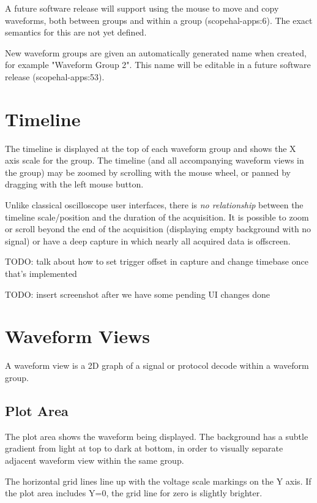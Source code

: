 \documentclass[11pt]{article}
\begin{document}
A future software release will support using the mouse to move and copy waveforms, both between groups and within a
group (scopehal-apps:6). The exact semantics for this are not yet defined.

New waveform groups are given an automatically generated name when created, for example "Waveform Group 2". This name
will be editable in a future software release (scopehal-apps:53).

\pagebreak
\section{Timeline}

The timeline is displayed at the top of each waveform group and shows the X axis scale for the group. The timeline (and
all accompanying waveform views in the group) may be zoomed by scrolling with the mouse wheel, or panned by dragging
with the left mouse button.

Unlike classical oscilloscope user interfaces, there is \emph{no relationship} between the timeline scale/position and
the duration of the acquisition. It is possible to zoom or scroll beyond the end of the acquisition (displaying empty
background with no signal) or have a deep capture in which nearly all acquired data is offscreen.

TODO: talk about how to set trigger offset in capture and change timebase once that's implemented

TODO: insert screenshot after we have some pending UI changes done

\pagebreak
\section{Waveform Views}

A waveform view is a 2D graph of a signal or protocol decode within a waveform group.

\subsection{Plot Area}

The plot area shows the waveform being displayed. The background has a subtle gradient from light at top to dark at
bottom, in order to visually separate adjacent waveform view within the same group.

The horizontal grid lines line up with the voltage scale markings on the Y axis. If the plot area includes Y=0, the
grid line for zero is slightly brighter.
\end{document}
